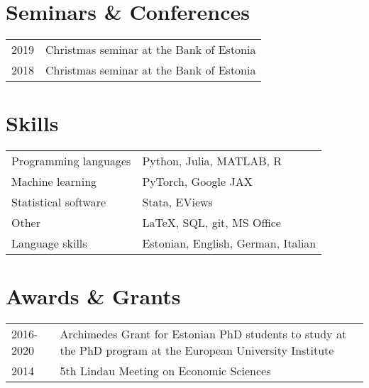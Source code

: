 \documentclass[a4, 11pt]{article}
\begin{document}
    \section*{Seminars \& Conferences}
\begin{table}[H]
    \begin{tabular}{p{2cm}p{14cm}}
        2019 & {Christmas seminar} at {the Bank of Estonia}\\
        2018 & {Christmas seminar} at {the Bank of Estonia}\\
    \end{tabular}
  \end{table}


    \section*{Skills}\begin{table}[H]
    \begin{tabular}{p{5cm}p{11cm}}
        Programming languages & Python, Julia, MATLAB, R \\
        Machine learning & PyTorch, Google JAX \\
        Statistical software & Stata, EViews \\
        Other & LaTeX, SQL, git, MS Office \\
        Language skills & Estonian, English, German, Italian \\
    \end{tabular}
  \end{table}


    \section*{Awards \& Grants}
  \begin{table}[H]
      \begin{tabular}{p{2.5cm}p{13.5cm}}
          2016-2020 & {Archimedes Grant for Estonian PhD students}{} to study at the PhD program at the European University Institute\\
          2014 & {5th Lindau Meeting on Economic Sciences}{}\\
      \end{tabular}
    \end{table}

    
\end{document}
